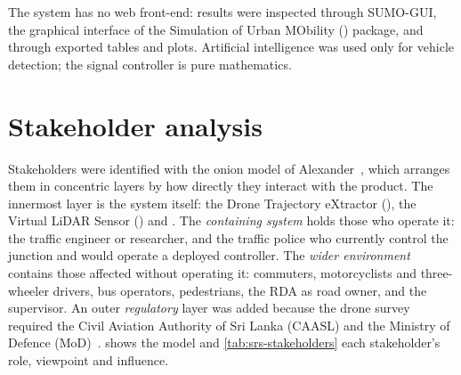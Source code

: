 The system has no web front-end: results were inspected through SUMO-GUI, the graphical interface of the Simulation of Urban MObility (\sumo{}) package, and through exported tables and plots. Artificial intelligence was used only for vehicle detection; the signal controller is pure mathematics.

\section{Stakeholder analysis}\label{sec:srs-stakeholders}

Stakeholders were identified with the onion model of Alexander~\cite{alexander2005taxonomy}, which arranges them in concentric layers by how directly they interact with the product. The innermost layer is the system itself: the Drone Trajectory eXtractor (\dtx{}), the Virtual LiDAR Sensor (\vls{}) and \prism{}. The \emph{containing system} holds those who operate it: the traffic engineer or researcher, and the traffic police who currently control the junction and would operate a deployed controller. The \emph{wider environment} contains those affected without operating it: commuters, motorcyclists and three-wheeler drivers, bus operators, pedestrians, the RDA as road owner, and the supervisor. An outer \emph{regulatory} layer was added because the drone survey required the Civil Aviation Authority of Sri Lanka (CAASL) and the Ministry of Defence (MoD)~\cite{caasl_drone}.  shows the model and \cref{tab:srs-stakeholders} each stakeholder's role, viewpoint and influence.

